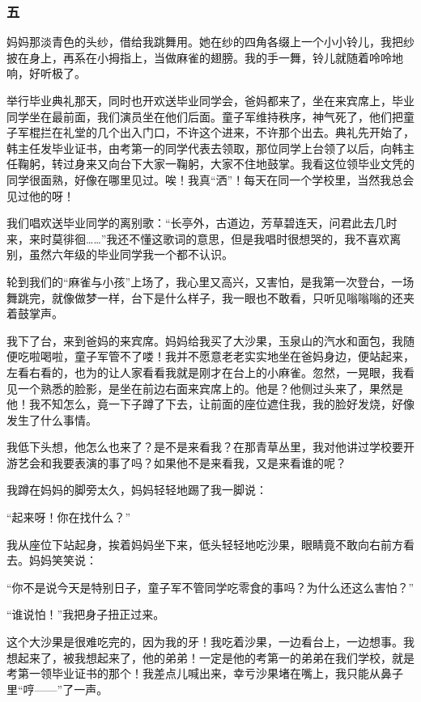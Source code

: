 \subsubsection*{五}


\par 妈妈那淡青色的头纱，借给我跳舞用。她在纱的四角各缀上一个小小铃儿，我把纱披在身上，再系在小拇指上，当做麻雀的翅膀。我的手一舞，铃儿就随着呤呤地响，好听极了。
\par 举行毕业典礼那天，同时也开欢送毕业同学会，爸妈都来了，坐在来宾席上，毕业同学坐在最前面，我们演员坐在他们后面。童子军维持秩序，神气死了，他们把童子军棍拦在礼堂的几个出入门口，不许这个进来，不许那个出去。典礼先开始了，韩主任发毕业证书，由考第一的同学代表去领取，那位同学上台领了以后，向韩主任鞠躬，转过身来又向台下大家一鞠躬，大家不住地鼓掌。我看这位领毕业文凭的同学很面熟，好像在哪里见过。唉！我真“洒”！每天在同一个学校里，当然我总会见过他的呀！
\par 我们唱欢送毕业同学的离别歌：“长亭外，古道边，芳草碧连天，问君此去几时来，来时莫徘徊……”我还不懂这歌词的意思，但是我唱时很想哭的，我不喜欢离别，虽然六年级的毕业同学我一个都不认识。
\par 轮到我们的“麻雀与小孩”上场了，我心里又高兴，又害怕，是我第一次登台，一场舞跳完，就像做梦一样，台下是什么样子，我一眼也不敢看，只听见嗡嗡嗡的还夹着鼓掌声。
\par 我下了台，来到爸妈的来宾席。妈妈给我买了大沙果，玉泉山的汽水和面包，我随便吃啦喝啦，童子军管不了喽！我并不愿意老老实实地坐在爸妈身边，便站起来，左看右看的，也为的让人家看看我就是刚才在台上的小麻雀。忽然，一晃眼，我看见一个熟悉的脸影，是坐在前边右面来宾席上的。他是？他侧过头来了，果然是他！我不知怎么，竟一下子蹲了下去，让前面的座位遮住我，我的脸好发烧，好像发生了什么事情。
\par 我低下头想，他怎么也来了？是不是来看我？在那青草丛里，我对他讲过学校要开游艺会和我要表演的事了吗？如果他不是来看我，又是来看谁的呢？
\par 我蹲在妈妈的脚旁太久，妈妈轻轻地踢了我一脚说：
\par “起来呀！你在找什么？”
\par 我从座位下站起身，挨着妈妈坐下来，低头轻轻地吃沙果，眼睛竟不敢向右前方看去。妈妈笑笑说：
\par “你不是说今天是特别日子，童子军不管同学吃零食的事吗？为什么还这么害怕？”
\par “谁说怕！”我把身子扭正过来。
\par 这个大沙果是很难吃完的，因为我的牙！我吃着沙果，一边看台上，一边想事。我想起来了，被我想起来了，他的弟弟！一定是他的考第一的弟弟在我们学校，就是考第一领毕业证书的那个！我差点儿喊出来，幸亏沙果堵在嘴上，我只能从鼻子里“哼——”了一声。
